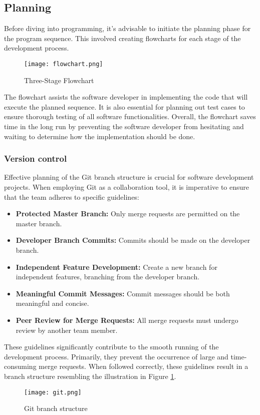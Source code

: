\documentclass[../report.tex]{subfiles}
\begin{document}
    \subsection{Planning}
    Before diving into programming, it's advisable to initiate the planning
    phase for the program sequence. This involved creating flowcharts for each
    stage of the development process.

    
    \begin{figure}[H]
        \centering
        \texttt{[image: flowchart.png]}
        \caption{Three-Stage Flowchart}
    \end{figure}

    The flowchart assists the software developer in implementing the code that
    will execute the planned sequence. It is also essential for planning out
    test cases to ensure thorough testing of all software functionalities.
    Overall, the flowchart saves time in the long run by preventing the
    software developer from hesitating and waiting to determine how the
    implementation should be done.

    \subsubsection{Version control}
    Effective planning of the Git branch structure is crucial for software
    development projects. When employing Git as a collaboration tool, it is
    imperative to ensure that the team adheres to specific guidelines:
    \begin{itemize}
        \item \textbf{Protected Master Branch:} Only merge requests are permitted on the master branch.
        \item \textbf{Developer Branch Commits:} Commits should be made on the developer branch.
        \item \textbf{Independent Feature Development:} Create a new branch for independent features, branching from the developer branch.
        \item \textbf{Meaningful Commit Messages:} Commit messages should be both meaningful and concise.
        \item \textbf{Peer Review for Merge Requests:} All merge requests must undergo review by another team member.
    \end{itemize}
    These guidelines significantly contribute to the smooth running of the
    development process. Primarily, they prevent the occurrence of large and
    time-consuming merge requests. When followed correctly, these guidelines
    result in a branch structure resembling the illustration in Figure
    \ref{fig:git}.
    \begin{figure}[H]
        \centering
        \texttt{[image: git.png]}
        \caption{Git branch structure}
        \label{fig:git}
    \end{figure}
\end{document}
